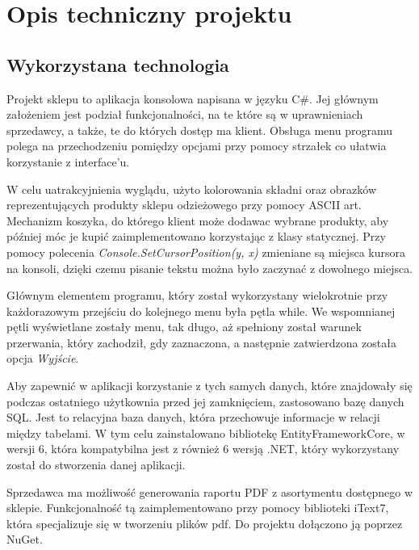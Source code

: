 ﻿\chapter{Opis techniczny projektu}
\section{Wykorzystana technologia}

Projekt sklepu to aplikacja konsolowa napisana w języku C\#. Jej głównym założeniem jest podział funkcjonalności, na te które są w uprawnieniach sprzedawcy, a także, 
te do których dostęp ma klient. Obsługa menu programu polega na przechodzeniu pomiędzy opcjami przy pomocy strzałek co ułatwia korzystanie z interface'u.\newline

W celu uatrakcyjnienia wyglądu, użyto kolorowania składni oraz obrazków reprezentujących produkty sklepu odzieżowego przy pomocy ASCII art. Mechanizm koszyka, do którego klient
może dodawac wybrane produkty, aby później móc je kupić zaimplementowano korzystając z klasy statycznej. Przy pomocy polecenia \textit{Console.SetCursorPosition(y, x)} zmieniane są miejsca
kursora na konsoli, dzięki czemu pisanie tekstu można było zaczynać z dowolnego miejsca.\newline

Głównym elementem programu, który został wykorzystany wielokrotnie przy każdorazowym przejściu do kolejnego menu była pętla while. We wspomnianej pętli wyświetlane zostały menu, tak długo, aż spełniony został warunek przerwania, który zachodził, gdy zaznaczona, a następnie zatwierdzona została opcja \textit{Wyjście}.\newline

Aby zapewnić w aplikacji korzystanie z tych samych danych, które znajdowały się podczas ostatniego użytkownia przed jej zamknięciem, zastosowano bazę danych SQL. Jest to relacyjna baza danych, która przechowuje informacje w relacji między tabelami. W tym celu zainstalowano bibliotekę EntityFrameworkCore, w wersji 6, która kompatybilna jest z również 6 wersją .NET, który wykorzystany został do stworzenia danej aplikacji.\newline

Sprzedawca ma możliwość generowania raportu PDF z asortymentu dostępnego w sklepie. Funkcjonalność tą zaimplementowano przy pomocy biblioteki iText7, która specjalizuje się w tworzeniu plików pdf. Do projektu dołączono ją poprzez NuGet.

